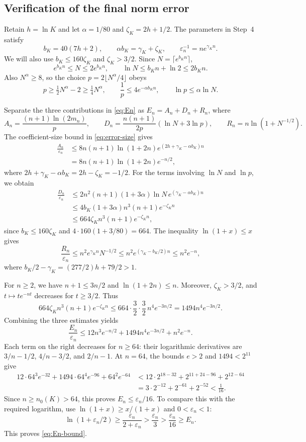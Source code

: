 \documentclass[11pt]{article}
\numberwithin{equation}{section}
\theoremstyle{boldremark}\newtheorem{remark}[theorem]{Remark}
\begin{document}
\subsection{Verification of the final norm error}
\label{app:haar-error}

Retain $h=\ln K$ and let $\alpha=1/80$ and $\zeta_K=2h+1/2$.
The parameters in Step~4 satisfy
\[
 b_K=40(7h+2),\qquad \alpha b_K=\gamma_K+\zeta_K,
 \qquad \varepsilon_n^{-1}=ne^{\gamma_Kn}.
\]
We will also use $b_K\le160\zeta_K$ and $\zeta_K>3/2$.
Since $N=\lceil e^{b_Kn}\rceil$,
\[
 e^{b_Kn}\le N\le2e^{b_Kn},\qquad
 \ln N\le b_Kn+\ln2\le2b_Kn.
\]
Also $N^\alpha\ge8$, so the choice
$p=2\lfloor N^\alpha/4\rfloor$ obeys
\[
 p\ge\tfrac12N^\alpha-2\ge\tfrac14N^\alpha,
 \qquad \frac1p\le4e^{-\alpha b_Kn},
 \qquad \ln p\le\alpha\ln N.
\]

Separate the three contributions in \eqref{eq:En} as
$E_n=A_n+D_n+R_n$, where
\[
 A_n=\frac{(n+1)\ln(2m_n)}p,\qquad
 D_n=\frac{n(n+1)}{2p}(\ln N+3\ln p),\qquad
 R_n=n\ln(1+N^{-1/2}).
\]
The coefficient-size bound in \eqref{eq:error-size} gives
\begin{align*}
 \frac{A_n}{\varepsilon_n}
 &\le8n(n+1)\ln(1+2n)
       e^{(2h+\gamma_K-\alpha b_K)n}\\
 &=8n(n+1)\ln(1+2n)e^{-n/2},
\end{align*}
where $2h+\gamma_K-\alpha b_K=2h-\zeta_K=-1/2$.
For the terms involving $\ln N$ and $\ln p$, we obtain
\begin{align*}
 \frac{D_n}{\varepsilon_n}
 &\le2n^2(n+1)(1+3\alpha)\ln N\,
       e^{(\gamma_K-\alpha b_K)n}\\
 &\le4b_K(1+3\alpha)n^3(n+1)e^{-\zeta_Kn}\\
 &\le664\zeta_Kn^3(n+1)e^{-\zeta_Kn},
\end{align*}
since $b_K\le160\zeta_K$ and
$4\cdot160(1+3/80)=664$.
The inequality $\ln(1+x)\le x$ gives
\[
 \frac{R_n}{\varepsilon_n}
 \le n^2e^{\gamma_Kn}N^{-1/2}
 \le n^2e^{(\gamma_K-b_K/2)n}
 \le n^2e^{-n},
\]
where $b_K/2-\gamma_K=(277/2)h+79/2>1$.

For $n\ge2$, we have $n+1\le3n/2$ and $\ln(1+2n)\le n$.
Moreover, $\zeta_K>3/2$, and $t\mapsto te^{-nt}$ decreases for
$t\ge3/2$. Thus
\[
 664\zeta_Kn^3(n+1)e^{-\zeta_Kn}
 \le664\cdot\frac32\cdot\frac32\,n^4e^{-3n/2}
 =1494n^4e^{-3n/2}.
\]
Combining the three estimates yields
\[
 \frac{E_n}{\varepsilon_n}
 \le12n^3e^{-n/2}+1494n^4e^{-3n/2}+n^2e^{-n}.
\]
Each term on the right decreases for $n\ge64$: their logarithmic
derivatives are $3/n-1/2$, $4/n-3/2$, and $2/n-1$.
At $n=64$, the bounds $e>2$ and $1494<2^{11}$ give
\begin{align*}
 12\cdot64^3e^{-32}
 +1494\cdot64^4e^{-96}+64^2e^{-64}
 &<12\cdot2^{18-32}+2^{11+24-96}+2^{12-64}\\
 &=3\cdot2^{-12}+2^{-61}+2^{-52}<\frac1{16}.
\end{align*}
Since $n\ge n_0(K)>64$, this proves $E_n\le\varepsilon_n/16$.
To compare this with the required logarithm, use
$\ln(1+x)\ge x/(1+x)$ and $0<\varepsilon_n<1$:
\[
 \ln(1+\varepsilon_n/2)
 \ge\frac{\varepsilon_n}{2+\varepsilon_n}
 >\frac{\varepsilon_n}{3}
 >\frac{\varepsilon_n}{16}
 \ge E_n.
\]
This proves \eqref{eq:En-bound}.
\end{document}
